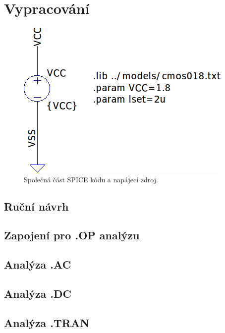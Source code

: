 \documentclass{protokol}
\begin{document}
	\maketitle

\section{Vypracování}
\begin{figure}[h!]
  \centering
  \includegraphics[scale=0.5]{spice0.png}
  \caption{Společná část SPICE kódu a napájecí zdroj.}
  \label{fig:spice0-png}
\end{figure}
 
\clearpage
\subsection{Ruční návrh}


\clearpage
\subsection{Zapojení pro .OP analýzu}


\clearpage
\subsection{Analýza .AC}


\clearpage
\subsection{Analýza .DC}


\clearpage
\subsection{Analýza .TRAN}

\end{document}
